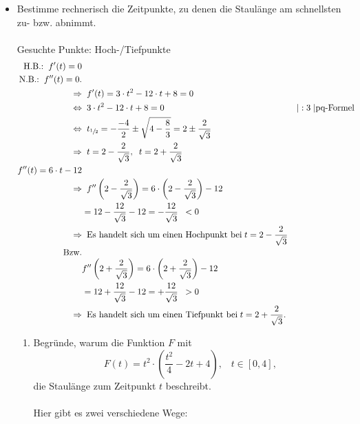\begin{itemize}
    \item Bestimme rechnerisch die Zeitpunkte, zu denen die Staulänge am schnellsten zu- bzw. abnimmt.\\\\
      Gesuchte Punkte: Hoch-/Tiefpunkte\\
      \begin{align*}
        \text{H.B.:} \;\; f'(t)=0&\\
        \text{N.B.:} \;\; f''(t)=0.&\\
        \Rightarrow & \;\; f'(t)=3\cdot t^2 - 12\cdot t + 8=0 \\
        \Leftrightarrow & \;\; 3\cdot t^2 - 12\cdot t + 8 = 0 &&|:3\; |\text{pq-Formel}\\
        \Leftrightarrow & \;\; t_{\sfrac{1}{2}}= -\frac{-4}{2} \pm \sqrt{4-\frac{8}{3}} = 2 \pm \frac{2}{\sqrt{3}}&&\\
        \Rightarrow &\;\; t=2-\frac{2}{\sqrt{3}} ,\;\; t=2+\frac{2}{\sqrt{3}}&&\\
        f''(t) = 6\cdot t - 12 &&\\
        \Rightarrow & \;\; f''\left(2-\frac{2}{\sqrt{3}}\right)=6\cdot\left(2-\frac{2}{\sqrt{3}}\right)-12 &&\\
        &= 12-\frac{12}{\sqrt{3}}-12 = -\frac{12}{\sqrt{3}} \;\; < 0 &&\\
        \Rightarrow & \;\; \text{Es handelt sich um einen Hochpunkt bei} \; t=2-\frac{2}{\sqrt{3}}&&\\
        \text{Bzw.} & &&\\
        & f''\left(2+\frac{2}{\sqrt{3}}\right)=6\cdot\left(2+\frac{2}{\sqrt{3}}\right)-12 &&\\
        &= 12+\frac{12}{\sqrt{3}}-12 = +\frac{12}{\sqrt{3}} \;\; > 0 &&\\
        \Rightarrow & \;\; \text{Es handelt sich um einen Tiefpunkt bei} \; t=2+\frac{2}{\sqrt{3}}.
      \end{align*}
      \begin{enumerate}
             \item Begründe, warum die Funktion $F$ mit
             \begin{equation*}
                   F(t) = t^2\cdot\left(\frac{t^2}{4}-2t+4\right), \;\;\; t \in \left[0,4\right],
             \end{equation*}
             die Staulänge zum Zeitpunkt $t$ beschreibt.\\\\
             Hier gibt es zwei verschiedene Wege:\\

\end{enumerate}
\end{itemize}
